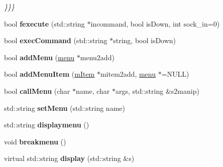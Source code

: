 \begin{DoxyCompactItemize}
\begin{DoxyCompactList}\small\item\em \}\}\} \end{DoxyCompactList}\item 
bool {\bfseries fexecute} (std\+::string $\ast$incommand, bool is\+Down, int sock\+\_\+in=0)\hypertarget{classcommandI_a0806b8b86073d973d0077c760bfdc021}{}\label{classcommandI_a0806b8b86073d973d0077c760bfdc021}

\item 
bool {\bfseries exec\+Command} (std\+::string $\ast$string, bool is\+Down)\hypertarget{classcommandI_af8c50972789602de8887644174ac7f84}{}\label{classcommandI_af8c50972789602de8887644174ac7f84}

\item 
bool {\bfseries add\+Menu} (\hyperlink{classmenu}{menu} $\ast$menu2add)\hypertarget{classcommandI_a139847064175c83ad620c1588da2b271}{}\label{classcommandI_a139847064175c83ad620c1588da2b271}

\item 
bool {\bfseries add\+Menu\+Item} (\hyperlink{classmItem}{m\+Item} $\ast$mitem2add, \hyperlink{classmenu}{menu} $\ast$=N\+U\+LL)\hypertarget{classcommandI_ac0d225c450873f89466bb07ef8cb83d9}{}\label{classcommandI_ac0d225c450873f89466bb07ef8cb83d9}

\item 
bool {\bfseries call\+Menu} (char $\ast$name, char $\ast$args, std\+::string \&s2manip)\hypertarget{classcommandI_a95dee376e4e42a9011ef08886af1be18}{}\label{classcommandI_a95dee376e4e42a9011ef08886af1be18}

\item 
std\+::string {\bfseries set\+Menu} (std\+::string name)\hypertarget{classcommandI_a67f350774bd122797ccf390edd13fe48}{}\label{classcommandI_a67f350774bd122797ccf390edd13fe48}

\item 
std\+::string {\bfseries displaymenu} ()\hypertarget{classcommandI_ab01af6d09f26b2594619d5bab88e78c2}{}\label{classcommandI_ab01af6d09f26b2594619d5bab88e78c2}

\item 
void {\bfseries breakmenu} ()\hypertarget{classcommandI_a9fd6c025b73a4c96627b6a8de1bec1a4}{}\label{classcommandI_a9fd6c025b73a4c96627b6a8de1bec1a4}

\item 
virtual std\+::string {\bfseries display} (std\+::string \&s)\hypertarget{classcommandI_a1c2f548d92f094a84f33a4c655d697a0}{}\label{classcommandI_a1c2f548d92f094a84f33a4c655d697a0}

\end{DoxyCompactItemize}
